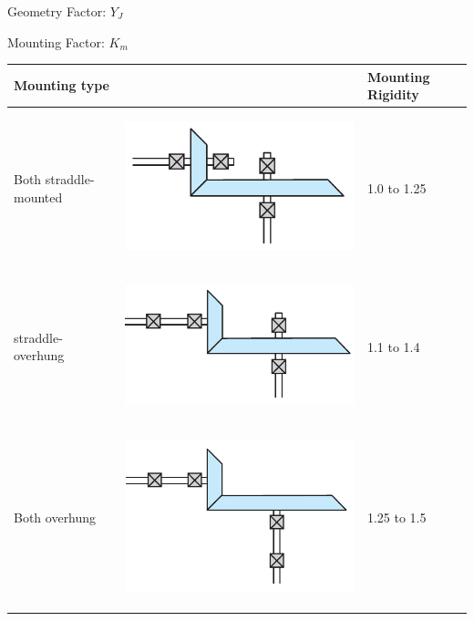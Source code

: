 \documentclass[a4paper,openany]{tufte-book}
\begin{document}
Geometry Factor: \(Y_{J}\)

Mounting Factor: \(K_{m}\)

\begin{center}
\begin{tabular}{lll}
Mounting type &  & Mounting Rigidity\\
\hline
Both straddle-mounted & \begin{center}
\includegraphics[width=.9\linewidth]{pictures/Gears/both-straddle.png}
\end{center} & 1.0 to 1.25\\
straddle-overhung & \begin{center}
\includegraphics[width=.9\linewidth]{pictures/Gears/straddle-overhung.png}
\end{center} & 1.1 to 1.4\\
Both overhung & \begin{center}
\includegraphics[width=.9\linewidth]{pictures/Gears/both-overhung.png}
\end{center} & 1.25 to 1.5\\
\end{tabular}
\end{center}
\end{document}
